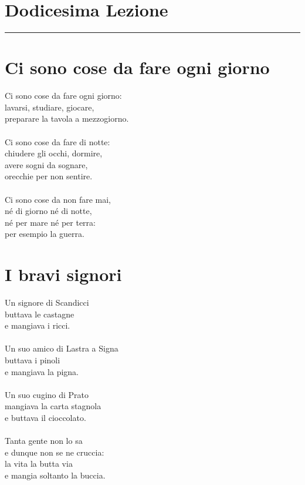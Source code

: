 \documentclass[letter,11pt]{article}
\begin{document}
\section*{\Large{Dodicesima Lezione}}
\noindent\rule{16cm}{1pt}

\setlength{\parindent}{260pt}

\begin{multicols}{2}
\vskip 0.2in
\section*{Ci sono cose da fare ogni giorno}
\vskip 0.2in


\noindent Ci sono cose da fare ogni giorno: \\
lavarsi, studiare, giocare, \\
preparare la tavola a mezzogiorno. \\
\\
\noindent Ci sono cose da fare di notte: \\
chiudere gli occhi, dormire, \\
avere sogni da sognare, \\
orecchie per non sentire. \\
\\
\noindent Ci sono cose da non fare mai, \\
né di giorno né di notte, \\
né per mare né per terra: \\
per esempio la guerra. \\


\section*{I bravi signori}
\vskip 0.2in

\noindent Un signore di Scandicci \\
buttava le castagne \\
e mangiava i ricci. \\
\\
\noindent Un suo amico di Lastra a Signa \\
buttava i pinoli \\
e mangiava la pigna. \\
\\
\noindent Un suo cugino di Prato \\
mangiava la carta stagnola \\
e buttava il cioccolato. \\
\\
\noindent Tanta gente non lo sa \\
e dunque non se ne cruccia: \\
la vita la butta via \\
e mangia soltanto la buccia. \\

\end{multicols}
\end{document}
